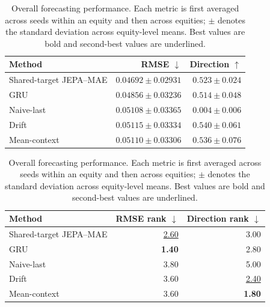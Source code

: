 \begin{table}[t]
\centering
\small
\caption{Overall forecasting performance. Each metric is first averaged across seeds within an equity and then across equities; $\pm$ denotes the standard deviation across equity-level means. Best values are bold and second-best values are underlined.}
\label{tab:main_metrics}
\begin{tabular}{lrr}
\toprule
Method & RMSE $\downarrow$ & Direction $\uparrow$ \\
\midrule
Shared-target JEPA--MAE & \textbf{$0.04692 \pm 0.02931$} & $0.523 \pm 0.024$ \\
GRU & \underline{$0.04856 \pm 0.03236$} & $0.514 \pm 0.048$ \\
Naive-last & $0.05108 \pm 0.03365$ & $0.004 \pm 0.006$ \\
Drift & $0.05115 \pm 0.03334$ & \textbf{$0.540 \pm 0.061$} \\
Mean-context & $0.05110 \pm 0.03306$ & \underline{$0.536 \pm 0.076$} \\
\bottomrule
\end{tabular}
\par\medskip
\begin{tabular}{lrr}
\toprule
Method & RMSE rank $\downarrow$ & Direction rank $\downarrow$ \\
\midrule
Shared-target JEPA--MAE & \underline{2.60} & 3.00 \\
GRU & \textbf{1.40} & 2.80 \\
Naive-last & 3.80 & 5.00 \\
Drift & 3.60 & \underline{2.40} \\
Mean-context & 3.60 & \textbf{1.80} \\
\bottomrule
\end{tabular}
\end{table}
